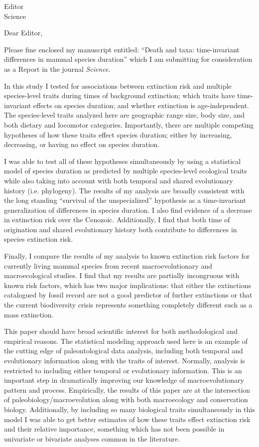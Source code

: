 \documentclass{letter}
\begin{document}
\begin{letter}{Editor \\ Science}
  \opening{Dear Editor,}
 
  Please fine enclosed my manuscript entitled: ``Death and taxa: time-invariant differences in mammal species duration'' which I am submitting for consideration as a Report in the journal \textit{Science}.

  In this study I tested for associations between extinction risk and multiple species-level traits during times of background extinction; which traits have time-invariant effects on species duration; and whether extinction is age-independent. The species-level traits analyzed here are geographic range size, body size, and both dietary and locomotor categories. Importantly, there are multiple competing hypotheses of how these traits effect species duration; either by increasing, decreasing, or having no effect on species duration.
 
  I was able to test all of these hypotheses simultaneously by using a statistical model of species duration as predicted by multiple species-level ecological traits while also taking into account with both temporal and shared evolutionary history (i.e. phylogeny). The results of my analysis are broadly consistent with the long standing ``survival of the unspecialized'' hypothesis as a time-invariant generalization of differences in species duration. I also find evidence of a decrease in extinction risk over the Cenozoic. Additionally, I find that both time of origination and shared evolutionary history both contribute to differences in species extinction risk.

  Finally, I compare the results of my analysis to known extinction risk factors for currently living mammal species from recent macroevolutionary and macroecological studies. I find that my results are partially incongruous with known risk factors, which has two major implications: that either the extinctions catalogued by fossil record are not a good predictor of further extinctions or that the current biodiversity crisis represents something completely different such as a mass extinction.

  This paper should have broad scientific interest for both methodological and empirical reasons. The statistical modeling approach used here is an example of the cutting edge of paleontological data analysis, including both temporal and evolutionary information along with the traits of interest. Normally, analysis is restricted to including either temporal or evolutionary information. This is an important step in dramatically improving our knowledge of macroevolutionary pattern and process. Empirically, the results of this paper are at the intersection of paleobiology/macroevolution along with both macroecology and conservation biology. Additionally, by including so many biological traits simultaneously in this model I was able to get better estimates of how these traits effect extinction risk and their relative importance, something which has not been possible in univariate or bivariate analyses common in the literature.


\end{letter}
\end{document}
